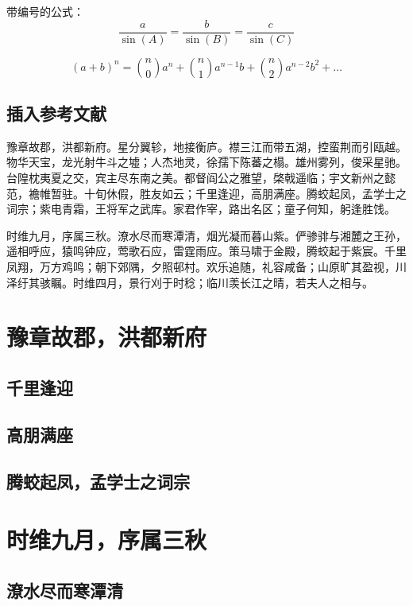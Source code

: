 \documentclass{QHUMaster}
\begin{document}
带编号的公式：
\begin{equation}
	\frac{a}{\sin(A)} = \frac{b}{\sin(B)} = \frac{c}{\sin(C)}
\end{equation}

\begin{equation}
	(a+b)^n = \binom{n}{0} a^n + \binom{n}{1} a^{n-1}b + \binom{n}{2} a^{n-2}b^2 + \ldots
\end{equation}

\lipsum[1]

\section{插入参考文献}

豫章故郡，洪都新府\cite{kocher99}。星分翼轸，地接衡庐。襟三江而带五湖，控蛮荆而引瓯越。物华天宝，龙光射牛斗之墟\cite{kocher99,cnproceed}；人杰地灵，徐孺下陈蕃之榻。雄州雾列，俊采星驰。台隍枕夷夏之交，宾主尽东南之美\cite{MELLINGER96,SHELL02,DPMG}。都督阎公之雅望，棨戟遥临；宇文新州之懿范，襜帷暂驻\cite{zhubajie}。十旬休假，胜友如云；千里逢迎，高朋满座。腾蛟起凤，孟学士之词宗；紫电青霜，王将军之武库。家君作宰，路出名区；童子何知，躬逢胜饯。

时维九月，序属三秋。潦水尽而寒潭清，烟光凝而暮山紫。俨骖𬴂与湘麓之王孙，遥相呼应，猿鸣钟应，莺歌石应，雷霆雨应。策马啸于金殿，腾蛟起于紫宸。千里凤翔，万方鸡鸣；朝下郊隅，夕照邨村。欢乐追随，礼容咸备；山原旷其盈视，川泽纡其骇瞩。时维四月，景行刈于时稔；临川羡长江之晴，若夫人之相与。


\chapter{豫章故郡，洪都新府}
\section{千里逢迎}
\zhlipsum[1-3]
\section{高朋满座}
\zhlipsum[1-5]
\section{腾蛟起凤，孟学士之词宗}
\chapter{时维九月，序属三秋}
\zhlipsum[1-3]
\section{潦水尽而寒潭清}
\zhlipsum[1-5]
\end{document}
